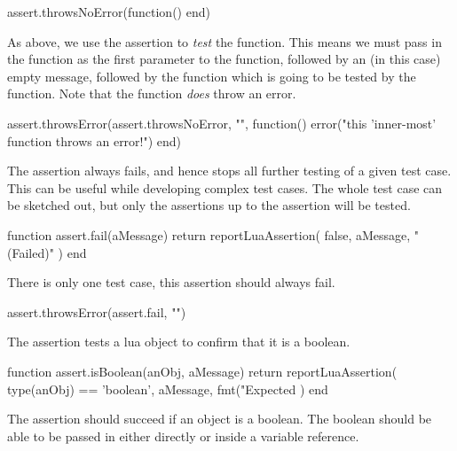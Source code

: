 \startLuaTest
  assert.throwsNoError(function() end)
\stopLuaTest
\stopTestCase


As above, we use the  assertion to \emph{test} 
the  function. This means we must pass in the 
 function as the first parameter to the 
  function, followed by an (in this 
case) empty message, followed by the function which is going to be tested 
by the  function. Note that the 
 function \emph{does} throw an error. 

\startLuaTest
  assert.throwsError(assert.throwsNoError, "", function()
    error("this 'inner-most' function throws an error!")
  end)
\stopLuaTest
\stopTestCase

\stopTestSuite


The  assertion always fails, and hence stops all further 
testing of a given test case. This can be useful while developing complex 
test cases. The whole test case can be sketched out, but only the 
assertions up to the  assertion will be tested. 

\startLuaCode
function assert.fail(aMessage)
  return reportLuaAssertion(
    false,
    aMessage,
    "(Failed)"
  )
end
\stopLuaCode


There is only one test case, this assertion should always fail.

\startLuaTest
  assert.throwsError(assert.fail, "")
\stopLuaTest
\stopTestCase

\stopTestSuite


The  assertion tests a lua object to confirm that 
it is a boolean. 

\startLuaCode
function assert.isBoolean(anObj, aMessage)
  return reportLuaAssertion(
    type(anObj) == 'boolean',
    aMessage,
    fmt("Expected %
  )
end
\stopLuaCode


The  assertion should succeed if an object is a 
boolean. The boolean should be able to be passed in either directly or 
inside a variable reference. 

